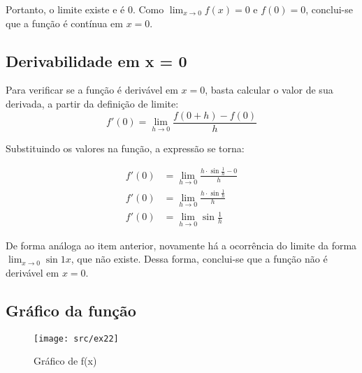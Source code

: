\documentclass[../resumo.tex]{subfiles}
\begin{document}
	Portanto, o limite existe e é 0. Como $\lim_{x\to0}f(x) = 0$ e $f(0) = 0$, conclui-se que a função
	é contínua em $x = 0$.

	\subsection{Derivabilidade em x = 0}

	Para verificar se a função é derivável em $x = 0$, basta calcular o valor de sua derivada, a partir
	da definição de limite:
	\[f'(0) = \lim_{h\to0} \frac{f(0 + h) - f(0)}{h}\]

	Substituindo os valores na função, a expressão se torna:

	\begin{align*}
			f'(0) &= \lim_{h\to0} \frac{h\cdot\sin{\frac{1}{h}} - 0}{h} \\
			f'(0) &= \lim_{h\to0} \frac{h\cdot\sin{\frac{1}{h}}}{h} \\
			f'(0) &= \lim_{h\to0}\sin{\frac{1}{h}}
	\end{align*}

	De forma análoga ao item anterior, novamente há a ocorrência do limite da forma $\lim_{x\to0} \sin{1}{x}$,
	que não existe. Dessa forma, conclui-se que a função não é derivável em $x = 0$.

	\subsection{Gráfico da função}

	\begin{figure}[H]
			\centering
			\texttt{[image: src/ex22]}
			\caption{Gráfico de f(x)}
	\end{figure}
\end{document}
